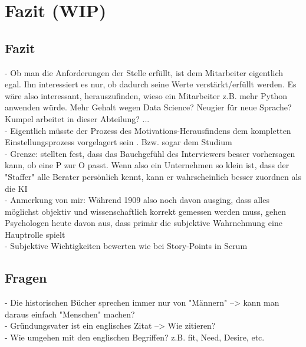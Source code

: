 \chapter{Fazit (WIP)}
\label{ch:fazit}
\section{Fazit}
\label{ch:fazit:fazit}
- Ob man die Anforderungen der Stelle erfüllt, ist dem Mitarbeiter eigentlich egal. Ihn interessiert es nur, ob dadurch seine Werte verstärkt/erfüllt werden. Es wäre also interessant, herauszufinden, wieso ein Mitarbeiter z.B. mehr Python anwenden würde. Mehr Gehalt wegen Data Science? Neugier für neue Sprache? Kumpel arbeitet in dieser Abteilung? ... \\
- Eigentlich müsste der Prozess des Motivations-Herausfindens dem kompletten Einstellungsprozess vorgelagert sein . Bzw. sogar dem Studium \\
- Grenze: \textcite{cable:1997} stellten fest, dass das Bauchgefühl des Interviewers besser vorhersagen kann, ob eine P zur O passt. Wenn also ein Unternehmen so klein ist, dass der "Staffer" alle Berater persönlich kennt, kann er wahrscheinlich besser zuordnen als die KI \\
- Anmerkung von mir: Während \textcite{parsons:1909} 1909 also noch davon ausging, dass alles möglichst objektiv und wissenschaftlich korrekt gemessen werden muss, gehen Psychologen heute davon aus, dass primär die subjektive Wahrnehmung eine Hauptrolle spielt \\
- Subjektive Wichtigkeiten bewerten wie bei Story-Points in Scrum

\section{Fragen}
\label{ch:fazit:fragen}
- Die historischen Bücher sprechen immer nur von "Männern" --> kann man daraus einfach "Menschen" machen?\\ 
- Gründungsvater ist ein englisches Zitat --> Wie zitieren?\\ 
- Wie umgehen mit den englischen Begriffen? z.B. fit, Need, Desire, etc. 

